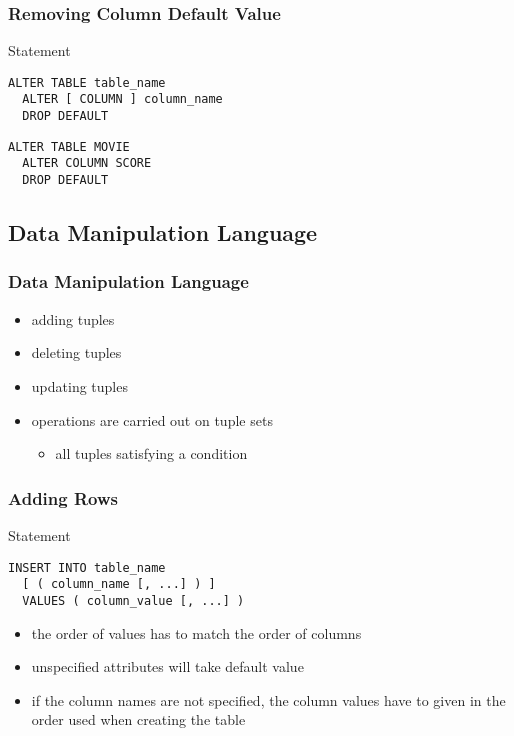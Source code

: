 \documentclass[dvipsnames]{beamer}
\theoremstyle{plain}
\begin{document}
\begin{frame}[fragile]
  \frametitle{Removing Column Default Value}

  \begin{block}{Statement}
    \begin{lstlisting}
ALTER TABLE table_name
  ALTER [ COLUMN ] column_name
  DROP DEFAULT
    \end{lstlisting}
  \end{block}

  \pause
  \begin{example}
    \begin{lstlisting}
ALTER TABLE MOVIE
  ALTER COLUMN SCORE
  DROP DEFAULT
    \end{lstlisting}
  \end{example}
\end{frame}

\subsection{Data Manipulation Language}

\begin{frame}
  \frametitle{Data Manipulation Language}

  \begin{itemize}
    \item adding tuples
    \item deleting tuples
    \item updating tuples

    \pause
    \bigskip
    \item operations are carried out on tuple sets
    \begin{itemize}
      \item all tuples satisfying a condition
    \end{itemize}
  \end{itemize}
\end{frame}

\begin{frame}[fragile]
  \frametitle{Adding Rows}

  \begin{block}{Statement}
    \begin{lstlisting}
INSERT INTO table_name
  [ ( column_name [, ...] ) ]
  VALUES ( column_value [, ...] )
    \end{lstlisting}
  \end{block}

  \pause
  \begin{itemize}
    \item the order of values has to match the order of columns
    \item unspecified attributes will take default value
    \item if the column names are not specified, the column values have to given
      in the order used when creating the table
  \end{itemize}
\end{frame}
\end{document}
